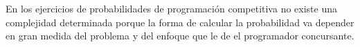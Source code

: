 En los ejercicios de probabilidades de programación competitiva no existe una complejidad determinada porque la forma de calcular la probabilidad va depender en gran medida del problema y del enfoque que le de el programador concursante.